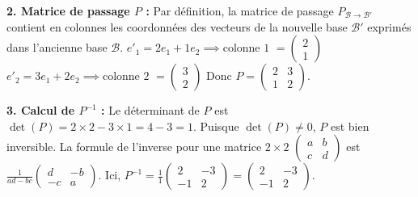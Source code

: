 \documentclass{report}
\begin{document}
\textbf{2. Matrice de passage $P$ :}
Par définition, la matrice de passage $P_{\mathcal{B} \to \mathcal{B}'}$ contient en colonnes les coordonnées des vecteurs de la nouvelle base $\mathcal{B}'$ exprimés dans l'ancienne base $\mathcal{B}$.
$e'_1 = 2e_1 + 1e_2 \implies \text{colonne 1 } = \begin{pmatrix} 2 \\ 1 \end{pmatrix}$
$e'_2 = 3e_1 + 2e_2 \implies \text{colonne 2 } = \begin{pmatrix} 3 \\ 2 \end{pmatrix}$
Donc $P = \begin{pmatrix} 2 & 3 \\ 1 & 2 \end{pmatrix}$.

\textbf{3. Calcul de $P^{-1}$ :}
Le déterminant de $P$ est $\det(P) = 2 \times 2 - 3 \times 1 = 4 - 3 = 1$.
Puisque $\det(P) \neq 0$, $P$ est bien inversible.
La formule de l'inverse pour une matrice $2 \times 2$ $\begin{pmatrix} a & b \\ c & d \end{pmatrix}$ est $\frac{1}{ad-bc} \begin{pmatrix} d & -b \\ -c & a \end{pmatrix}$.
Ici, $P^{-1} = \frac{1}{1} \begin{pmatrix} 2 & -3 \\ -1 & 2 \end{pmatrix} = \begin{pmatrix} 2 & -3 \\ -1 & 2 \end{pmatrix}$.
\end{document}
